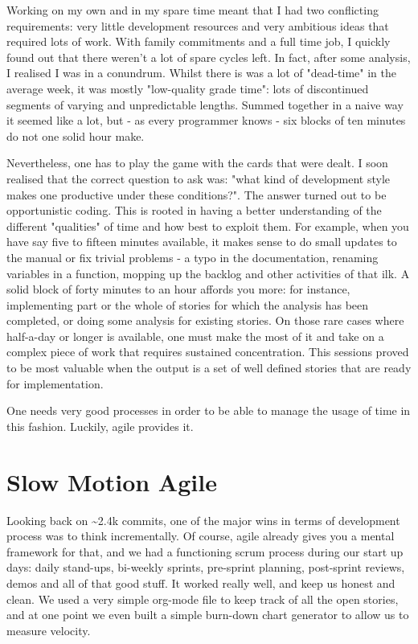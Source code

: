\documentclass{book}
\begin{document}
Working on my own and in my spare time meant that I had two
conflicting requirements: very little development resources and very
ambitious ideas that required lots of work. With family commitments
and a full time job, I quickly found out that there weren't a lot of
spare cycles left. In fact, after some analysis, I realised I was in a
conundrum. Whilst there is was a lot of "dead-time" in the average
week, it was mostly "low-quality grade time": lots of discontinued
segments of varying and unpredictable lengths. Summed together in a
naive way it seemed like a lot, but - as every programmer knows - six
blocks of ten minutes do not one solid hour make.

Nevertheless, one has to play the game with the cards that were dealt.
I soon realised that the correct question to ask was: "what kind of
development style makes one productive under these conditions?". The
answer turned out to be opportunistic coding. This is rooted in having
a better understanding of the different "qualities" of time and how
best to exploit them. For example, when you have say five to fifteen
minutes available, it makes sense to do small updates to the manual or
fix trivial problems - a typo in the documentation, renaming variables
in a function, mopping up the backlog and other activities of that
ilk. A solid block of forty minutes to an hour affords you more: for
instance, implementing part or the whole of stories for which the
analysis has been completed, or doing some analysis for existing
stories. On those rare cases where half-a-day or longer is available,
one must make the most of it and take on a complex piece of work that
requires sustained concentration. This sessions proved to be most
valuable when the output is a set of well defined stories that are
ready for implementation.

One needs very good processes in order to be able to manage the usage
of time in this fashion. Luckily, agile provides it.

\section*{Slow Motion Agile}
\label{sec-2}

Looking back on \textasciitilde{}2.4k commits, one of the major wins in terms of
development process was to think incrementally. Of course, agile
already gives you a mental framework for that, and we had a
functioning scrum process during our start up days: daily stand-ups,
bi-weekly sprints, pre-sprint planning, post-sprint reviews, demos and
all of that good stuff. It worked really well, and keep us honest and
clean. We used a very simple org-mode file to keep track of all the
open stories, and at one point we even built a simple burn-down chart
generator to allow us to measure velocity.
\end{document}
